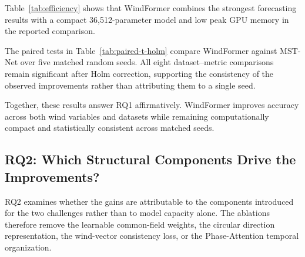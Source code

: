 Table~\ref{tab:efficiency} shows that WindFormer combines the strongest forecasting results with a compact 36,512-parameter model and low peak GPU memory in the reported comparison.

The paired tests in Table~\ref{tab:paired-t-holm} compare WindFormer against MST-Net over five matched random seeds. All eight dataset--metric comparisons remain significant after Holm correction, supporting the consistency of the observed improvements rather than attributing them to a single seed.



Together, these results answer RQ1 affirmatively. WindFormer improves accuracy across both wind variables and datasets while remaining computationally compact and statistically consistent across matched seeds.

\subsection{RQ2: Which Structural Components Drive the Improvements?}
\label{subsec:ablation}

RQ2 examines whether the gains are attributable to the components introduced for the two challenges rather than to model capacity alone. The ablations therefore remove the learnable common-field weights, the circular direction representation, the wind-vector consistency loss, or the Phase-Attention temporal organization.

